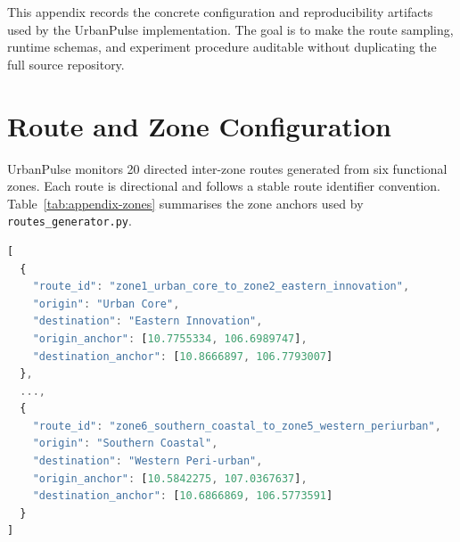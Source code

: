 This appendix records the concrete configuration and reproducibility artifacts
used by the UrbanPulse implementation. The goal is to make the route sampling,
runtime schemas, and experiment procedure auditable without duplicating the full
source repository.

\section{Route and Zone Configuration}

UrbanPulse monitors 20 directed inter-zone routes generated from six functional
zones. Each route is directional and follows a stable route identifier
convention. Table~\ref{tab:appendix-zones} summarises the zone anchors used
by \texttt{routes\_generator.py}.

\begin{table}[htbp]
\centering
\caption{UrbanPulse zone anchors used for route generation.}
\label{tab:appendix-zones}
\end{table}

\begin{lstlisting}[language=JavaScript, caption={Excerpt from the route configuration file.}, label={lst:route-config}]
[
  {
    "route_id": "zone1_urban_core_to_zone2_eastern_innovation",
    "origin": "Urban Core",
    "destination": "Eastern Innovation",
    "origin_anchor": [10.7755334, 106.6989747],
    "destination_anchor": [10.8666897, 106.7793007]
  },
  ...,
  {
    "route_id": "zone6_southern_coastal_to_zone5_western_periurban",
    "origin": "Southern Coastal",
    "destination": "Western Peri-urban",
    "origin_anchor": [10.5842275, 107.0367637],
    "destination_anchor": [10.6866869, 106.5773591]
  }
]
\end{lstlisting}


